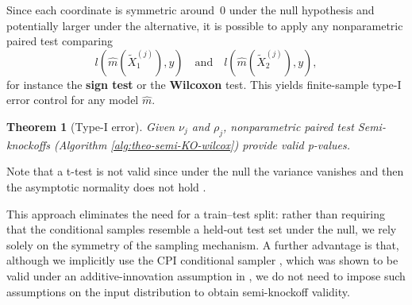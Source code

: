 \documentclass{article}
\theoremstyle{plain}
\newtheorem{theorem}{Theorem}[section]
\theoremstyle{definition}
\theoremstyle{remark}
\begin{document}
Since each coordinate is symmetric around~0 under the null hypothesis and potentially larger under the alternative, it is possible to apply any nonparametric paired test comparing
\[
l(\widehat{m}(\widetilde{X}^{(j)}_1), y)
\quad\text{and}\quad
l(\widehat{m}(\widetilde{X}^{(j)}_2), y),
\]
for instance the \textbf{sign test} or the \textbf{Wilcoxon} test. This yields finite-sample type-I error control for any model $\widehat{m}$.

\begin{theorem}[Type-I error] 
\label{thm:type-I-control}
Given $\nu_j$ and $\rho_j$, nonparametric paired test Semi-knockoffs (Algorithm \ref{alg:theo-semi-KO-wilcox}) provide valid p-values.
\end{theorem}

Note that a t-test is not valid since under the null the variance vanishes and then the asymptotic normality does not hold \cite{williamson2023general, LocoVSShapley}.  




This approach eliminates the need for a train–test split: rather than requiring that the conditional samples resemble a held-out test set under the null, we rely solely on the symmetry of the sampling mechanism. A further advantage is that, although we implicitly use the CPI conditional sampler \cite{chamma2024statistically}, which was shown to be valid under an additive-innovation assumption in \cite{reyerolobo2025conditionalfeatureimportancerevisited}, we do not need to impose such assumptions on the input distribution to obtain semi-knockoff validity.
\end{document}
